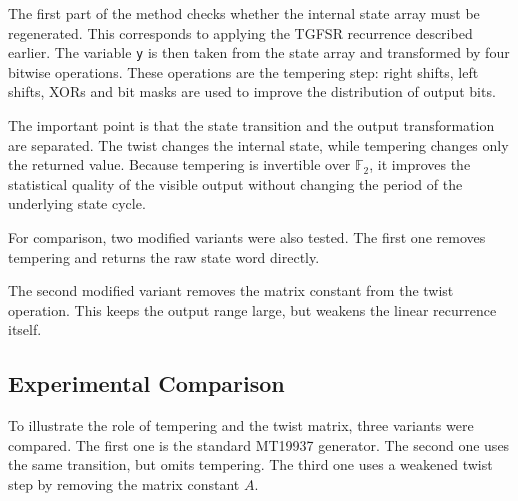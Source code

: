 
The first part of the method checks whether the internal state array must be regenerated. This corresponds to applying the TGFSR recurrence described earlier. The variable \texttt{y} is then taken from the state array and transformed by four bitwise operations. These operations are the tempering step: right shifts, left shifts, XORs and bit masks are used to improve the distribution of output bits.

The important point is that the state transition and the output transformation are separated. The twist changes the internal state, while tempering changes only the returned value. Because tempering is invertible over $\mathbb{F}_2$, it improves the statistical quality of the visible output without changing the period of the underlying state cycle.

For comparison, two modified variants were also tested. The first one removes tempering and returns the raw state word directly.


The second modified variant removes the matrix constant from the twist operation. This keeps the output range large, but weakens the linear recurrence itself.


\subsection{Experimental Comparison}

To illustrate the role of tempering and the twist matrix, three variants were compared. The first one is the standard MT19937 generator. The second one uses the same transition, but omits tempering. The third one uses a weakened twist step by removing the matrix constant $A$.


